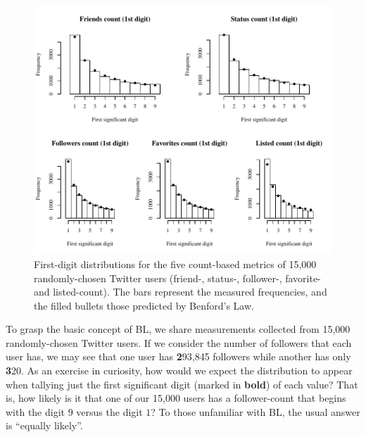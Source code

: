 \documentclass[twoside,leqno,twocolumn]{article}\usepackage[]{graphicx}\usepackage[]{color}
\makeatletter
\def\maxwidth{ %
  \ifdim\Gin@nat@width>\linewidth
    \linewidth
  \else
    \Gin@nat@width
  \fi
}
\newenvironment{knitrout}{}{} %
\makeatother
\begin{document}
\begin{knitrout}
\color{fgcolor}\begin{figure}[t!]
\includegraphics[width=\maxwidth]{figure/twitter-count-distributions-1} \caption[First-digit distributions for the five count-based metrics of 15,000 randomly-chosen Twitter users (friend-, status-, follower-, favorite- and listed-count)]{First-digit distributions for the five count-based metrics of 15,000 randomly-chosen Twitter users (friend-, status-, follower-, favorite- and listed-count). The bars represent the measured frequencies, and the filled bullets those predicted by Benford's Law.}\label{fig:twitter-count-distributions}
\end{figure}


\end{knitrout}

To grasp the basic concept of BL, we share measurements collected from 15,000 randomly-chosen Twitter users. If we consider the number of followers that each user has, we may see that one user has \textbf{2}93,845 followers while another has only \textbf{3}20. As an exercise in curiosity, how would we expect the distribution to appear when tallying just the first significant digit (marked in \textbf{bold}) of each value? That is, how likely is it that one of our 15,000 users has a follower-count that begins with the digit $9$ versus the digit $1$? To those unfamiliar with BL, the usual answer is ``equally likely''.
\end{document}
